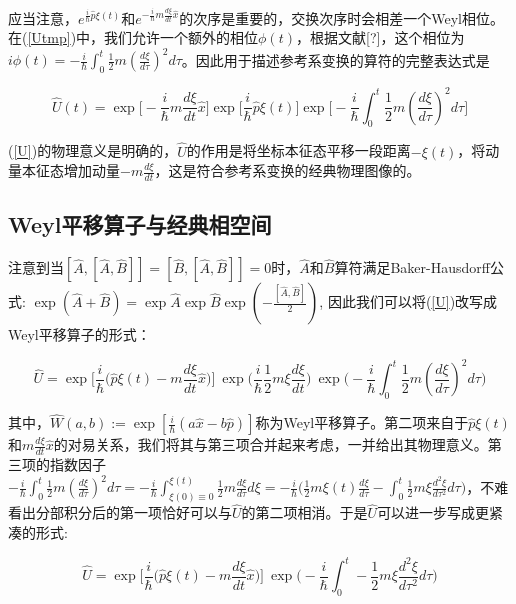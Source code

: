\documentclass[a4paper]{article}
\begin{document}
        应当注意，$e^{\frac{i}{\hbar}\hat{p}\xi(t)}$和$e^{-\frac{i}{\hbar}m\frac{d\xi}{dt}\hat{x}}$的次序是重要的，交换次序时会相差一个Weyl相位。在(\ref{Utmp})中，我们允许一个额外的相位$\phi(t)$，根据文献[?]，这个相位为$i\phi(t)=-\frac{i}{\hbar}\int_0^t\frac{1}{2}m(\frac{d \xi}{d\tau})^2 d\tau$。因此用于描述参考系变换的算符的完整表达式是

        \begin{equation}\label{U}
            \hat{U}(t) = \exp\biggl[-\frac{i}{\hbar}m\frac{d\xi}{dt}\hat{x}\biggr] \exp\biggl[\frac{i}{\hbar}\hat{p}\xi(t)\biggr] \exp\biggl[-\frac{i}{\hbar}\int_0^t\frac{1}{2}m(\frac{d \xi}{d\tau})^2 d\tau\biggr]
        \end{equation}

        (\ref{U})的物理意义是明确的，$\hat{U}$的作用是将坐标本征态平移一段距离$-\xi(t)$，将动量本征态增加动量$-m\frac{d \xi}{dt}$，这是符合参考系变换的经典物理图像的。

    \subsection{Weyl平移算子与经典相空间}

        注意到当$[\hat{A}, [\hat{A}, \hat{B}]]=[\hat{B}, [\hat{A}, \hat{B}]]=0$时，$\hat{A}$和$\hat{B}$算符满足Baker-Hausdorff公式: $\exp(\hat{A}+\hat{B})=\exp\hat{A} \exp\hat{B} \exp(-\frac{[\hat{A}, \hat{B}]}{2})$, 因此我们可以将(\ref{U})改写成Weyl平移算子的形式：

        \begin{equation}
            \hat{U}=\exp\bigg[\frac{i}{\hbar}\bigg(\hat{p}\xi(t)-m\frac{d\xi}{dt}\hat{x} \bigg) \bigg]\ \exp\bigg(\frac{i}{\hbar}\frac{1}{2}m\xi\frac{d\xi}{dt} \bigg)\ \exp\bigg(-\frac{i}{\hbar}\int_0^t\frac{1}{2}m(\frac{d \xi}{d\tau})^2 d\tau \bigg)
        \end{equation}

        其中，$\hat{W}(a,b):=\exp[\frac{i}{\hbar}(a\hat{x}-b\hat{p})]$称为Weyl平移算子。第二项来自于$\hat{p}\xi(t)$和$m\frac{d\xi}{dt}\hat{x}$的对易关系，我们将其与第三项合并起来考虑，一并给出其物理意义。第三项的指数因子$-\frac{i}{\hbar}\int_0^t\frac{1}{2}m(\frac{d \xi}{d\tau})^2 d\tau = -\frac{i}{\hbar}\int_{\xi(0)\equiv 0}^{\xi(t)}\frac{1}{2}m\frac{d \xi}{d\tau} d\xi = -\frac{i}{\hbar}\bigg(\frac{1}{2}m\xi(t)\frac{d \xi}{d\tau}-\int_0^t\frac{1}{2}m\xi\frac{d^2\xi}{d\tau^2} d\tau\bigg)$，不难看出分部积分后的第一项恰好可以与$\hat{U}$的第二项相消。于是$\hat{U}$可以进一步写成更紧凑的形式:

        \begin{equation}\label{U-Weyl}
            \hat{U} = \exp\bigg[\frac{i}{\hbar}\bigg(\hat{p}\xi(t)-m\frac{d\xi}{dt}\hat{x} \bigg) \bigg]\ \exp\bigg( -\frac{i}{\hbar}\int_0^t-\frac{1}{2}m\xi\frac{d^2\xi}{d\tau^2} d\tau\bigg)
        \end{equation}
\end{document}
